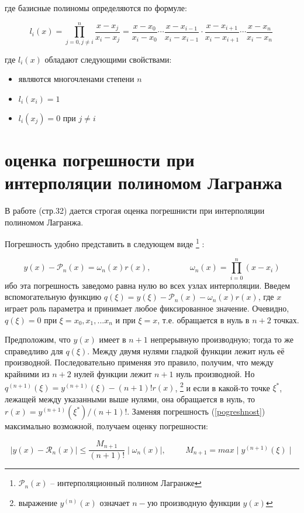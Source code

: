 \documentclass[a4paper,11pt]{article}
\begin{document}
где базисные полиномы определяются по формуле:

$$l_i(x)=\prod_{j=0, j\neq i}^{n} \frac{x-x_j}{x_i-x_j} = \frac{x-x_0}{x_i-x_0} \cdots \frac{x-x_{i-1}}{x_i-x_{i-1}} \cdot \frac{x-x_{i+1}}{x_i-x_{i+1}} \cdots \frac{x-x_{n}}{x_i-x_{n}}\,\!$$

где $l_i(x)$ обладают следующими свойствами:
\begin{itemize}
\item являются многочленами степени $n$
\item $l_i(x_i) = 1$
\item $l_i(x_j) = 0$ при $j \neq i$
\end{itemize}


\section{оценка погрешности при интерполяции полиномом Лагранжа}
В работе \cite{spline2} (стр.32)  дается строгая оценка погрешнисти при интерполяции полиномом Лагранжа.


Погрешность удобно представить в следующем виде
\footnote{$\mathcal{P}_n(x)$ -- интерполяционный полином Лагранже}
:

\begin{equation}
y(x) - \mathcal{P}_n(x) = \omega_n(x) r(x),
\hspace{2cm}
\omega_n(x) = \prod\limits_{i=0}^n (x-x_i)
\label{pogreshnost}
\end{equation}
ибо эта погрешность заведомо равна нулю во всех узлах интерполяции.
Введем вспомогательную функцию $q(\xi) = y(\xi) - \mathcal{P}_n(x) - \omega_n(x) r(x)$,
где $x$ играет роль параметра и принимает любое фиксированное значение.
Очевидно, $q(\xi) = 0$ при $\xi=x_0,x_1,...x_n$ и при $\xi=x$, т.е. обращается в нуль
в $n+2$ точках.

Предположим, что $y(x)$ имеет в $n+1$ непрерывную производную; тогда то же справедливо
для $q(\xi)$. Между двумя нулями гладкой функции лежит нуль её производной.
Последовательно применяя это правило, получим, что между крайними из $n+2$ нулей функции
лежит $n+1$ нуль производной. Но $q^(n+1)(\xi) = y^(n+1)(\xi) - (n+1)! r(x)$,
\footnote{выражение $y^{(n)}(x)$ означает $n-$ую производную функции $y(x)$}
 и если в какой-то точке $\xi^*$, лежащей между указанными выше нулями, она обращается в нуль,
то $r(x)=y^(n+1)(\xi^*)/(n+1)!$. Заменяя погрешность (\ref{pogreshnost}) максимально
возможной, получаем оценку погрешности: 

$$
\mid y(x) - \mathcal{R}_n(x) \mid \leqslant 
\frac{M_{n+1}}{(n+1)!}\mid \omega_n(x)\mid, \hspace{1cm} M_{n+1} =max\mid y^{(n+1)}(\xi)\mid
$$
\end{document}
